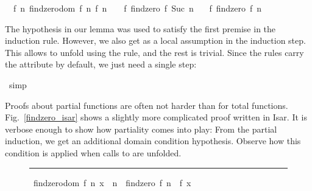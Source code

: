 \begin{isabellebody}
\begin{isamarkuptxt}
  \begin{isabelle}%
\ {}{\isachardot}\ {\isasymAnd}f\ n{\isachardot}\ {\isasymlbrakk}findzero{\isacharunderscore}dom\ {\isacharparenleft}f{\isacharcomma}\ n{\isacharparenright}{\isacharsemicolon}\ f\ n\ {\isasymnoteq}\ {}\ {\isasymLongrightarrow}\ f\ {\isacharparenleft}findzero\ f\ {\isacharparenleft}Suc\ n{\isacharparenright}{\isacharparenright}\ {\isacharequal}\ {}{\isasymrbrakk}\isanewline
{}\ f\ {\isacharparenleft}findzero\ f\ n{\isacharparenright}\ {\isacharequal}\ {}%
\end{isabelle}

  The hypothesis in our lemma was used to satisfy the first premise in
  the induction rule. However, we also get  as a local assumption in the induction step. This
  allows to unfold  using the 
  rule, and the rest is trivial. Since the  rules carry the
   attribute by default, we just need a single step:%
\end{isamarkuptxt}%
\isamarkuptrue%
\isamarkupfalse%
\ simp\isanewline
{}\isamarkupfalse%
%
\endisatagproof
{\isafoldproof}%
%
\isadelimproof
%
\endisadelimproof
%
\begin{isamarkuptext}%
Proofs about partial functions are often not harder than for total
  functions. Fig.~\ref{findzero_isar} shows a slightly more
  complicated proof written in Isar. It is verbose enough to show how
  partiality comes into play: From the partial induction, we get an
  additional domain condition hypothesis. Observe how this condition
  is applied when calls to  are unfolded.%
\end{isamarkuptext}%
\isamarkuptrue%
%
\begin{figure}
\hrule\vspace{6pt}
\begin{minipage}{0.8\textwidth}
\isastyle\isamarkuptrue
{}\isamarkupfalse%
\ {\isachardoublequoteopen}{\isasymlbrakk}findzero{\isacharunderscore}dom\ {\isacharparenleft}f{\isacharcomma}\ n{\isacharparenright}{\isacharsemicolon}\ x\ {\isasymin}\ {\isacharbraceleft}n\ {\isachardot}{\isachardot}{\isacharless}\ findzero\ f\ n{\isacharbraceright}{\isasymrbrakk}\ {\isasymLongrightarrow}\ f\ x\ {\isasymnoteq}\ {}{\isachardoublequoteclose}\isanewline

\end{minipage}
\end{figure}
\end{isabellebody}
